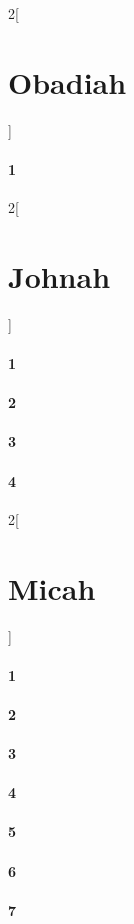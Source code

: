 \documentclass{book}
\begin{document}
\begin{multicols}{2}[\part{Obadiah}]
\subsection*{1}
\end{multicols}
\begin{multicols}{2}[\part{Johnah}]
\subsection*{1}
\subsection*{2}
\subsection*{3}
\subsection*{4}
\end{multicols}
\begin{multicols}{2}[\part{Micah}]
\subsection*{1}
\subsection*{2}
\subsection*{3}
\subsection*{4}
\subsection*{5}
\subsection*{6}
\subsection*{7}
\end{multicols}
\end{document}
